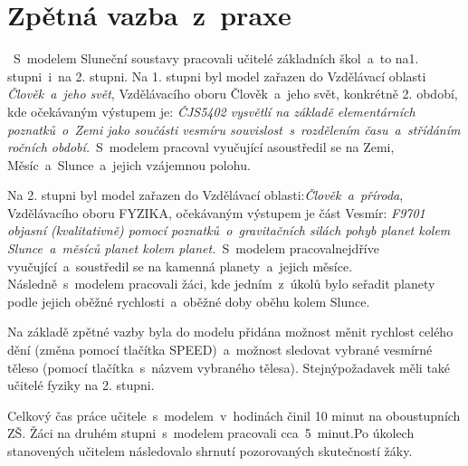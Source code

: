 \documentclass[FM,BP]{tulthesis}
\begin{document}
\section{Zpětná vazba~z~praxe}
~S~modelem Sluneční soustavy pracovali učitelé základních škol~a~to na1. stupni~i~na 2. stupni. Na 1. stupni byl model zařazen do Vzdělávací oblasti \textit{Člověk~a~jeho svět}, Vzdělávacího oboru Člověk~a~jeho svět, konkrétně 2. období, kde očekávaným výstupem je: \textit{ČJS5402 vysvětlí na základě elementárních poznatků~o~Zemi jako součásti vesmíru souvislost~s~rozdělením času~a~střídáním ročních období.}~S~modelem pracoval vyučující asoustředil se na Zemi, Měsíc~a~Slunce~a~jejich vzájemnou polohu.

Na 2. stupni byl model zařazen do Vzdělávací oblasti:\textit{Člověk~a~příroda}, Vzdělávacího oboru FYZIKA, očekávaným výstupem je část Vesmír: \textit{F9701 objasní (kvalitativně) pomocí poznatků~o~gravitačních silách pohyb planet kolem Slunce~a~měsíců planet kolem planet.}~S~modelem pracovalnejdříve vyučující~a~soustředil se na kamenná planety~a~jejich měsíce. Následně~s~modelem pracovali žáci, kde jedním~z~úkolů bylo seřadit planety podle jejich oběžné rychlosti~a~oběžné doby oběhu kolem Slunce.

Na základě zpětné vazby byla do modelu přidána možnost měnit rychlost celého dění (změna pomocí tlačítka SPEED)~a~možnost sledovat vybrané vesmírné těleso (pomocí tlačítka~s~názvem vybraného tělesa). Stejnýpožadavek měli také učitelé fyziky na 2. stupni.

Celkový čas práce učitele~s~modelem~v~hodinách činil 10 minut na oboustupních ZŠ. Žáci na druhém stupni~s~modelem pracovali cca~5~minut.Po úkolech stanovených učitelem následovalo shrnutí pozorovaných skutečností žáky.
\newpage
\end{document}
